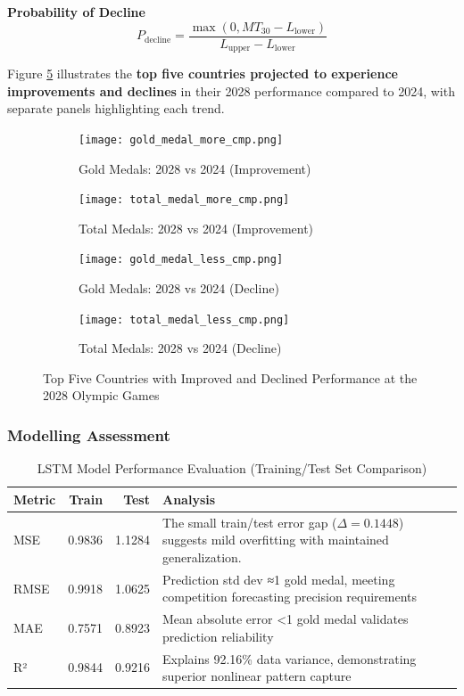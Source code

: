 \documentclass{mcmthesis}
\begin{document}
\textbf{Probability of Decline} 
\[
P_{\text{decline}} = \frac{\max(0, MT_{30} - L_{\text{lower}})}{L_{\text{upper}} - L_{\text{lower}}}
\]

Figure \ref{fig:medal_comparison_combined} illustrates the \textbf{top five countries projected to experience improvements and declines} in their 2028 performance compared to 2024, with separate panels highlighting each trend.

\begin{figure}[H]
	\centering
	\begin{subfigure}[b]{0.45\textwidth}
		\texttt{[image: gold\_medal\_more\_cmp.png]}
		\caption{Gold Medals: 2028 vs 2024 (Improvement)}
		\label{fig:gold_medal}
	\end{subfigure}
	\hfill
	\begin{subfigure}[b]{0.45\textwidth}
		\texttt{[image: total\_medal\_more\_cmp.png]}
		\caption{Total Medals: 2028 vs 2024 (Improvement)}
		\label{fig:total_medal}
	\end{subfigure}
	\vspace{0.5cm}
	\begin{subfigure}[b]{0.45\textwidth}
		\texttt{[image: gold\_medal\_less\_cmp.png]}
		\caption{Gold Medals: 2028 vs 2024 (Decline)}
		\label{fig:gold_medal1}
	\end{subfigure}
	\hfill
	\begin{subfigure}[b]{0.45\textwidth}
		\texttt{[image: total\_medal\_less\_cmp.png]}
		\caption{Total Medals: 2028 vs 2024 (Decline)}
		\label{fig:total_medal1}
	\end{subfigure}
	\caption{Top Five Countries with Improved and Declined Performance at the 2028 Olympic Games}
	\label{fig:medal_comparison_combined}
\end{figure}

\subsubsection{Modelling Assessment}

\begin{table}[H]
	\centering
	\caption{LSTM Model Performance Evaluation (Training/Test Set Comparison)}
	\label{tab:model_performance}
	\begin{tabular}{lrrp{8cm}}
		\toprule
		\rowcolor{red!10}
		\textbf{Metric} & \textbf{Train} & \textbf{Test} & \textbf{Analysis} \\
		\midrule
		\rowcolor{gray!10}
		MSE  & 0.9836 & 1.1284 & The small train/test error gap (\(\Delta = 0.1448\)) suggests mild overfitting with maintained generalization.\\
		RMSE & 0.9918 & 1.0625 & Prediction std dev ≈1 gold medal, meeting competition forecasting precision requirements \\
		\rowcolor{gray!10}
		MAE  & 0.7571 & 0.8923 & Mean absolute error <1 gold medal validates prediction reliability \\
		R²   & 0.9844 & 0.9216 & Explains 92.16\% data variance, demonstrating superior nonlinear pattern capture \\
		\bottomrule
	\end{tabular}
\end{table}
\end{document}

